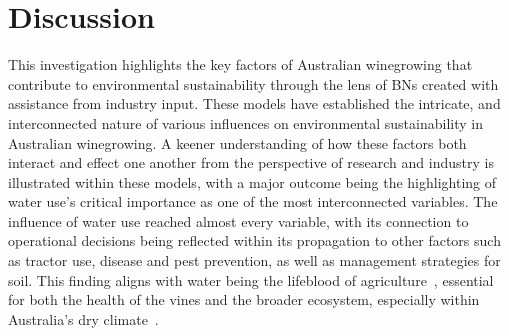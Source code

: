 









\section{Discussion}

This investigation highlights the key factors of Australian winegrowing that contribute to  environmental sustainability through the lens of BNs created with assistance from industry input. These models have established the intricate, and interconnected nature of various influences on environmental sustainability in Australian winegrowing. A keener understanding of how these factors both interact and effect one another from the perspective of research and industry is illustrated within these models, with a major outcome being the highlighting of water use's critical importance as one of the most interconnected variables. The influence of water use reached almost every variable, with its connection to operational decisions being reflected within its propagation to other factors such as tractor use, disease and pest prevention, as well as management strategies for soil. This finding aligns with water being the lifeblood of agriculture~\cite{chawlaWaterProductivityAgriculture2023}, essential for both the health of the vines and the broader ecosystem, especially within Australia's dry climate~\cite{australianbureauofstatisticsWaterUseAustralian2021}.

